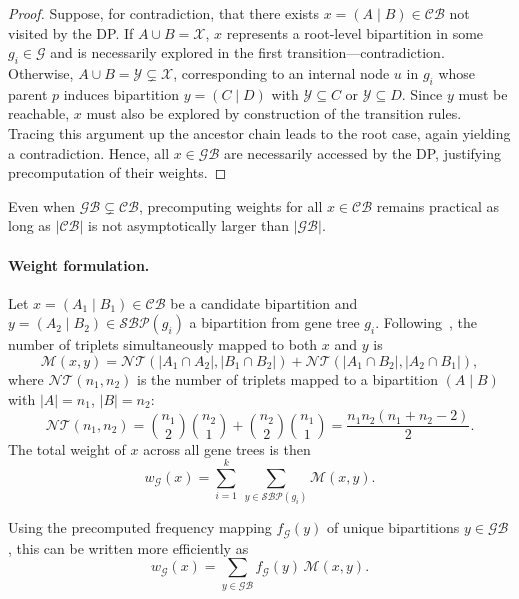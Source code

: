 \documentclass[10pt,a4paper]{article}
\begin{document}
\begin{enumerate}
\begin{proof}
Suppose, for contradiction, that there exists $x = (A \mid B) \in \mathcal{CB}$ not visited by the DP.  
If $A \cup B = \mathcal{X}$, $x$ represents a root-level bipartition in some $g_i \in \mathcal{G}$ and is necessarily explored in the first transition—contradiction.  
Otherwise, $A \cup B = \mathcal{Y} \subsetneq \mathcal{X}$, corresponding to an internal node $u$ in $g_i$ whose parent $p$ induces bipartition $y = (C \mid D)$ with $\mathcal{Y} \subseteq C$ or $\mathcal{Y} \subseteq D$.  
Since $y$ must be reachable, $x$ must also be explored by construction of the transition rules.  
Tracing this argument up the ancestor chain leads to the root case, again yielding a contradiction.  
Hence, all $x \in \mathcal{GB}$ are necessarily accessed by the DP, justifying precomputation of their weights.
\end{proof}

Even when $\mathcal{GB} \subsetneq \mathcal{CB}$, precomputing weights for all $x \in \mathcal{CB}$ remains practical as long as $|\mathcal{CB}|$ is not asymptotically larger than $|\mathcal{GB}|$.

\paragraph{Weight formulation.}
Let $x = (A_1 \mid B_1) \in \mathcal{CB}$ be a candidate bipartition and $y = (A_2 \mid B_2) \in \mathcal{SBP}(g_i)$ a bipartition from gene tree $g_i$.  
Following~\cite{stelar}, the number of triplets simultaneously mapped to both $x$ and $y$ is
\begin{equation}
\mathcal{M}(x,y) = 
\mathcal{NT}(|A_1 \cap A_2|, |B_1 \cap B_2|) +
\mathcal{NT}(|A_1 \cap B_2|, |A_2 \cap B_1|),
\label{eq:Mxy}
\end{equation}
where $\mathcal{NT}(n_1,n_2)$ is the number of triplets mapped to a bipartition $(A \mid B)$ with $|A| = n_1$, $|B| = n_2$:
\begin{equation}
\mathcal{NT}(n_1,n_2) = 
\binom{n_1}{2}\binom{n_2}{1} + 
\binom{n_2}{2}\binom{n_1}{1}
= \frac{n_1 n_2 (n_1 + n_2 - 2)}{2}.
\label{eq:NT}
\end{equation}
The total weight of $x$ across all gene trees is then
\begin{equation}
w_{\mathcal{G}}(x) = \sum_{i=1}^{k} \ \sum_{y \in \mathcal{SBP}(g_i)} \mathcal{M}(x,y).
\end{equation}

Using the precomputed frequency mapping $f_{\mathcal{G}}(y)$ of unique bipartitions $y \in \mathcal{GB}$, this can be written more efficiently as
\begin{equation}
w_{\mathcal{G}}(x) = \sum_{y \in \mathcal{GB}} f_{\mathcal{G}}(y) \, \mathcal{M}(x,y).
\label{eq:effcal}
\end{equation}


\end{enumerate}
\end{document}

